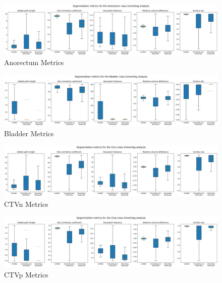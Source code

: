 \documentclass[12pt,twoside]{report}
\begin{document}
\begin{landscape}

  \begin{figure}[H]
    \centering
    \includegraphics[width=\linewidth]{../../research/source/code/data/metrics/metricsanorectum_1_combinednotable_UniverSeg_analysis.png}
    \caption{Anorectum Metrics}\label{fig:universeg-metrics-anorectum}
  \end{figure}

  \begin{figure}[H]
    \centering
    \includegraphics[width=\linewidth]{../../research/source/code/data/metrics/metricsbladder_1_combinednotable_UniverSeg_analysis.png}
    \caption{Bladder Metrics}\label{fig:universeg-metrics-bladder}
  \end{figure}

  \begin{figure}[H]
    \centering
    \includegraphics[width=\linewidth]{../../research/source/code/data/metrics/metricsctvn_1_combinednotable_UniverSeg_analysis.png}
    \caption{CTVn Metrics}\label{fig:universeg-metrics-ctvn}
  \end{figure}

  \begin{figure}[H]
    \centering
    \includegraphics[width=\linewidth]{../../research/source/code/data/metrics/metricsctvp_1_combinednotable_UniverSeg_analysis.png}
    \caption{CTVp Metrics}\label{fig:universeg-metrics-ctvp}
  \end{figure}


\end{landscape}
\end{document}

